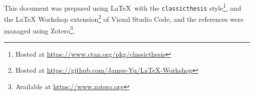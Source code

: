 \documentclass[../thesis.tex]{subfiles}
\begin{document}
This document was prepared using \LaTeX\ with the \texttt{classicthesis}
style\footnote{Hosted at \url{https://www.ctan.org/pkg/classicthesis}}, and the LaTeX
Workshop extension\footnote{Hosted at \url{https://github.com/James-Yu/LaTeX-Workshop}}
of Visual Studio Code, and the references were managed using Zotero\footnote{Available
at \url{https://www.zotero.org}}.
\end{document}
